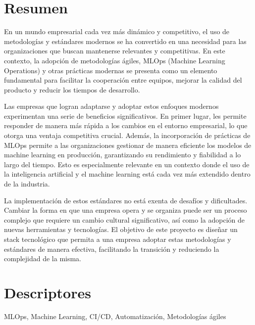 \section*{Resumen}
En un mundo empresarial cada vez más dinámico y competitivo, el uso de metodologías 
y estándares modernos se ha convertido en una necesidad para las organizaciones 
que buscan mantenerse relevantes y competitivas. En este contexto, la adopción de 
metodologías ágiles, MLOps (Machine Learning Operations) y otras prácticas modernas 
se presenta como un elemento fundamental para facilitar la cooperación entre equipos, 
mejorar la calidad del producto y reducir los tiempos de desarrollo.\medskip

Las empresas que logran adaptarse y adoptar estos enfoques modernos experimentan una 
serie de beneficios significativos. En primer lugar, les permite responder de manera 
más rápida a los cambios en el entorno empresarial, lo que otorga una ventaja 
competitiva crucial. Además, la incorporación de prácticas de MLOps permite a las organizaciones 
gestionar de manera eficiente los modelos de machine learning en producción, 
garantizando su rendimiento y fiabilidad a lo largo del tiempo. Esto es especialmente 
relevante en un contexto donde el uso de la inteligencia artificial y el machine 
learning está cada vez más extendido dentro de la industria.\medskip

La implementación de estos estándares no está exenta de desafíos y dificultades. 
Cambiar la forma en que una empresa opera y se organiza puede ser un proceso complejo que 
requiere un cambio cultural significativo, así como la adopción de nuevas herramientas
y tecnologías. El objetivo de este proyecto es diseñar un stack tecnológico que permita 
a una empresa adoptar estas metodologías y estándares de manera efectiva, facilitando 
la transición y reduciendo la complejidad de la misma.

\section*{Descriptores}
MLOps, Machine Learning, CI/CD, Automatización, Metodologías ágiles

\pagebreak
\blankpage 
